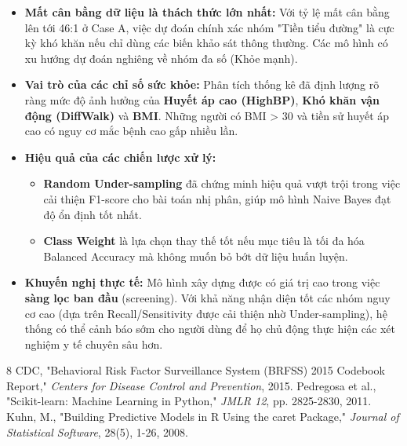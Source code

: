 \documentclass{article}
\begin{document}
\begin{itemize}
    \item \textbf{Mất cân bằng dữ liệu là thách thức lớn nhất:} Với tỷ lệ mất cân bằng lên tới 46:1 ở Case A, việc dự đoán chính xác nhóm "Tiền tiểu đường" là cực kỳ khó khăn nếu chỉ dùng các biến khảo sát thông thường. Các mô hình có xu hướng dự đoán nghiêng về nhóm đa số (Khỏe mạnh).
    \item \textbf{Vai trò của các chỉ số sức khỏe:} Phân tích thống kê đã định lượng rõ ràng mức độ ảnh hưởng của \textbf{Huyết áp cao (HighBP)}, \textbf{Khó khăn vận động (DiffWalk)} và \textbf{BMI}. Những người có BMI > 30 và tiền sử huyết áp cao có nguy cơ mắc bệnh cao gấp nhiều lần.
    \item \textbf{Hiệu quả của các chiến lược xử lý:}
          \begin{itemize}
              \item \textbf{Random Under-sampling} đã chứng minh hiệu quả vượt trội trong việc cải thiện F1-score cho bài toán nhị phân, giúp mô hình Naive Bayes đạt độ ổn định tốt nhất.
              \item \textbf{Class Weight} là lựa chọn thay thế tốt nếu mục tiêu là tối đa hóa Balanced Accuracy mà không muốn bỏ bớt dữ liệu huấn luyện.
          \end{itemize}
    \item \textbf{Khuyến nghị thực tế:} Mô hình xây dựng được có giá trị cao trong việc \textbf{sàng lọc ban đầu} (screening). Với khả năng nhận diện tốt các nhóm nguy cơ cao (dựa trên Recall/Sensitivity được cải thiện nhờ Under-sampling), hệ thống có thể cảnh báo sớm cho người dùng để họ chủ động thực hiện các xét nghiệm y tế chuyên sâu hơn.
\end{itemize}

\newpage
\begin{thebibliography}{8}
    CDC, "Behavioral Risk Factor Surveillance System (BRFSS) 2015 Codebook Report," \emph{Centers for Disease Control and Prevention}, 2015.
    Pedregosa et al., "Scikit-learn: Machine Learning in Python," \emph{JMLR 12}, pp. 2825-2830, 2011.
    Kuhn, M., "Building Predictive Models in R Using the caret Package," \emph{Journal of Statistical Software}, 28(5), 1-26, 2008.
\end{thebibliography}
\end{document}
